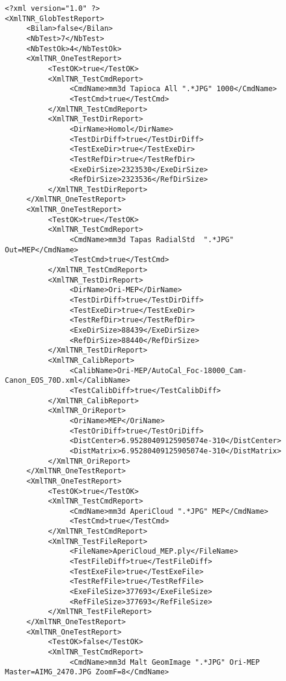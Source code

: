 \documentclass[a4paper]{book}
\begin{document}
\begin{lstlisting}
<?xml version="1.0" ?>
<XmlTNR_GlobTestReport>
     <Bilan>false</Bilan>
     <NbTest>7</NbTest>
     <NbTestOk>4</NbTestOk>
     <XmlTNR_OneTestReport>
          <TestOK>true</TestOK>
          <XmlTNR_TestCmdReport>
               <CmdName>mm3d Tapioca All ".*JPG" 1000</CmdName>
               <TestCmd>true</TestCmd>
          </XmlTNR_TestCmdReport>
          <XmlTNR_TestDirReport>
               <DirName>Homol</DirName>
               <TestDirDiff>true</TestDirDiff>
               <TestExeDir>true</TestExeDir>
               <TestRefDir>true</TestRefDir>
               <ExeDirSize>2323530</ExeDirSize>
               <RefDirSize>2323536</RefDirSize>
          </XmlTNR_TestDirReport>
     </XmlTNR_OneTestReport>
     <XmlTNR_OneTestReport>
          <TestOK>true</TestOK>
          <XmlTNR_TestCmdReport>
               <CmdName>mm3d Tapas RadialStd  ".*JPG" Out=MEP</CmdName>
               <TestCmd>true</TestCmd>
          </XmlTNR_TestCmdReport>
          <XmlTNR_TestDirReport>
               <DirName>Ori-MEP</DirName>
               <TestDirDiff>true</TestDirDiff>
               <TestExeDir>true</TestExeDir>
               <TestRefDir>true</TestRefDir>
               <ExeDirSize>88439</ExeDirSize>
               <RefDirSize>88440</RefDirSize>
          </XmlTNR_TestDirReport>
          <XmlTNR_CalibReport>
               <CalibName>Ori-MEP/AutoCal_Foc-18000_Cam-Canon_EOS_70D.xml</CalibName>
               <TestCalibDiff>true</TestCalibDiff>
          </XmlTNR_CalibReport>
          <XmlTNR_OriReport>
               <OriName>MEP</OriName>
               <TestOriDiff>true</TestOriDiff>
               <DistCenter>6.95280409125905074e-310</DistCenter>
               <DistMatrix>6.95280409125905074e-310</DistMatrix>
          </XmlTNR_OriReport>
     </XmlTNR_OneTestReport>
     <XmlTNR_OneTestReport>
          <TestOK>true</TestOK>
          <XmlTNR_TestCmdReport>
               <CmdName>mm3d AperiCloud ".*JPG" MEP</CmdName>
               <TestCmd>true</TestCmd>
          </XmlTNR_TestCmdReport>
          <XmlTNR_TestFileReport>
               <FileName>AperiCloud_MEP.ply</FileName>
               <TestFileDiff>true</TestFileDiff>
               <TestExeFile>true</TestExeFile>
               <TestRefFile>true</TestRefFile>
               <ExeFileSize>377693</ExeFileSize>
               <RefFileSize>377693</RefFileSize>
          </XmlTNR_TestFileReport>
     </XmlTNR_OneTestReport>
     <XmlTNR_OneTestReport>
          <TestOK>false</TestOK>
          <XmlTNR_TestCmdReport>
               <CmdName>mm3d Malt GeomImage ".*JPG" Ori-MEP Master=AIMG_2470.JPG ZoomF=8</CmdName>

\end{lstlisting}
\end{document}
